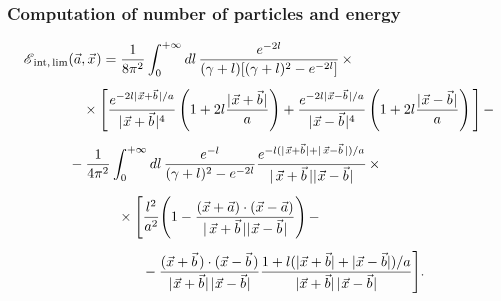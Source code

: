 \documentclass[10pt,t]{beamer}
\begin{document}
\begin{frame}
  \frametitle{Computation of number of particles and energy}

  \vspace{-1em}


  \begin{equation}
    \label{eq:Lokalna-gestosc-energii-w-granicy-ETC-14} %
    \begin{split}
      \EIntDenLim
      &( \veca, \vecx \HorSpaceOne ) =
        \frac{ 1 }{ 8\pi^{ 2 } }
        \int_{ 0 }^{ +\infty } dl \,
        \frac{ e^{ -2 l } }{ ( \gamma + l ) [ ( \gamma + l )^{ 2 } - e^{ -2 l } ] } \, \times
      \\[0.5em]
      &\hspace{1em}
        \times \Bigg[ \frac{ e^{ -2 l \absTwo{ \vecx + \vecb } / a } }{
        \absTwo{ \vecx + \vecb }^{ 4 } }
        \left( 1 + 2 l \frac{ \absTwo{ \vecx + \vecb } }{ a } \right) +
        \frac{ e^{ -2 l \absTwo{ \vecx - \vecb } / a } }{
        \absTwo{ \vecx - \vecb }^{ 4 } } \left( 1 +
        2 l \frac{ \absTwo{ \vecx - \vecb } }{ a } \right) \Bigg] \, -
      \\[0.5em]
      &- \frac{ 1 }{ 4 \pi^{ 2 } } \int_{ 0 }^{ +\infty } dl \,
        \frac{ e^{ -l } }{ ( \gamma + l )^{ 2 } - e^{ -2 l } }
        \frac{ e^{ -l ( \absOne{ \vecx + \vecb } + |\,
        \vecx - \vecb\, | ) / a } }{ |\, \vecx + \vecb\, | \absTwo{ \vecx -
        \vecb } } \, \times \\[0.5em]
      &\hspace{3.5em}
        \times \Bigg[ \frac{ l^{ 2 } }{ a^{ 2 } } \Bigg( 1 - \frac{ (
        \vecx + \veca ) \cdot ( \vecx - \veca ) }{ |\, \vecx
        + \vecb\, | \absTwo{ \vecx - \vecb } } \Bigg) \, - \\[0.5em]
      &\hspace{5.25em}
        - \frac{ ( \vecx + \vecb \HorSpaceSix ) \cdot
        ( \vecx - \vecb \HorSpaceSix ) }{
        \absOne{ \vecx + \vecb } \HorSpaceFive
        \absOne{ \vecx - \vecb } }
        \frac{ 1 + l ( | \vecx
        + \vecb | + | \vecx - \vecb | ) / a }{ | \vecx +
        \vecb | \, \absOne{ \vecx - \vecb } } \Bigg].
    \end{split}
  \end{equation}

\end{frame}
\end{document}
